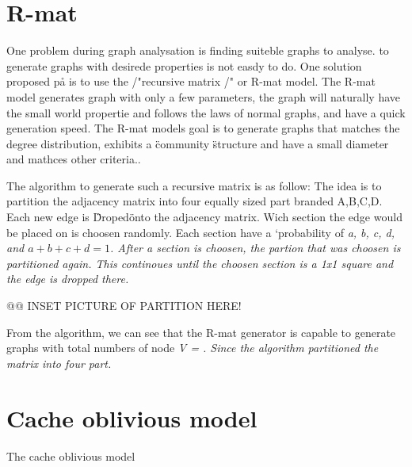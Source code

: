 \section{R-mat}
One problem during graph analysation is finding suiteble graphs to analyse. to generate graphs with desirede properties is not easdy to do. One solution proposed på \cite{RMat2004} is to use the /"recursive matrix /" or R-mat model. The R-mat model generates graph with only a few parameters, the graph will naturally have the small world propertie and follows the laws of normal graphs, and have a quick generation speed. The R-mat models goal is to generate graphs that matches the degree distribution, exhibits a \" community \" structure and have a small diameter and mathces other criteria.\cite{Rmat2004}.

The algorithm to generate such a recursive matrix is as follow: The idea is to partition the adjacency matrix into four equally sized part branded A,B,C,D. Each new edge is \"Droped\" onto the adjacency matrix. Wich section the edge would be placed on is choosen randomly. Each section have a `probability of \it{a, b, c, d}, and $a + b + c + d = 1$. After a section is choosen, the partion that was choosen is partitioned again. This continoues until the choosen section is a 1x1 square and the edge is dropped there. 

@@
INSET PICTURE OF PARTITION HERE!

From the algorithm, we can see that the R-mat generator is capable to generate graphs with total numbers of node \it{V} = . Since the algorithm partitioned the matrix into four part. 

\section{Cache oblivious model}
The cache oblivious model 
